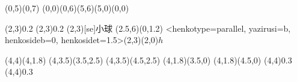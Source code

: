 \begin{zahyou*}[ul=5mm](0,5)(0,7)
    \drawline(0,0)(0,6)(5,6)(5,0)(0,0)    
    \def\P{(2,3)}
    \def\PU{(2,6)}
    \def\PD{(2,0)}
    \def\QD{(0,1.5)}
    \def\H{(4,4)}
    \def\E{(2.5,6)}
    \def\vvec{(0,1.2)}

    \small
    \Drawline{\PU\P}
    \En*[1]\P{0.2}
    \En\P{0.2}
    \Put\P[se]{小球}
    \Put\E{\Yasen\vvec}
    \HenKo<henkotype=parallel,
    yazirusi=b,
    henkosideb=0,
    henkosidet=1.5>\P\PD{$h$}

	\drawline(4,4)(4,1.8)
	\drawline(4,3.5)(3.5,2.5)
	\drawline(4,3.5)(4.5,2.5)
	\drawline(4,1.8)(3.5,0)
	\drawline(4,1.8)(4.5,0)
    \En*[0]\H{0.3}
    \En\H{0.3}
\end{zahyou*}

